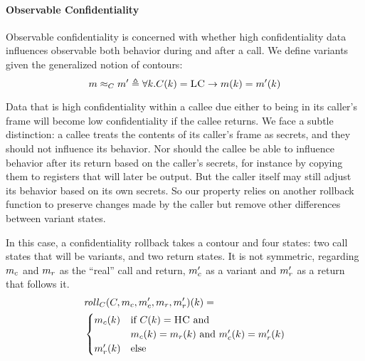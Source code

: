 \documentclass[conference]{IEEEtran}
\begin{document}
      
    \paragraph{Observable Confidentiality}

      Observable confidentiality is concerned with whether high confidentiality data influences
      observable both behavior during and after a call. We define variants given the generalized notion
      of contours:
      \[m \approx_C m' \triangleq \forall k .
      C(k) = \textsc{LC} \rightarrow m(k) = m'(k)\]

      Data that is high confidentiality within a callee due either to being in its caller's frame
      will become low confidentiality if the callee returns. We face a subtle distinction: 
      a callee treats the contents of its caller's frame as secrets, and they should not influence
      its behavior. Nor should the callee be able to influence behavior after its return based
      on the caller's secrets, for instance by copying them to registers that will later be output.
      But the caller itself may still adjust its behavior based on its own secrets. So our property
      relies on another rollback function to preserve changes made by the caller but remove other
      differences between variant states.

      In this case, a confidentiality rollback takes a contour and four states: two call states
      that will be variants, and two return states. It is not symmetric, regarding \(m_c\) and \(m_r\)
      as the ``real'' call and return, \(m_c'\) as a variant and \(m_r'\) as a return that follows it.
      \[\begin{split}
        & \mathit{roll}_C(C,m_c,m_c',m_r,m_r')(k) = \\
        & \begin{cases}
          m_c(k) & \text{if } C(k) = \textsc{HC} \text{ and } \\
                  & m_c(k) = m_r(k) \text{ and }
                    m_c'(k) = m_r'(k) \\
          m_r'(k) & \text{else} \\
        \end{cases}
      \end{split}\]
\end{document}
